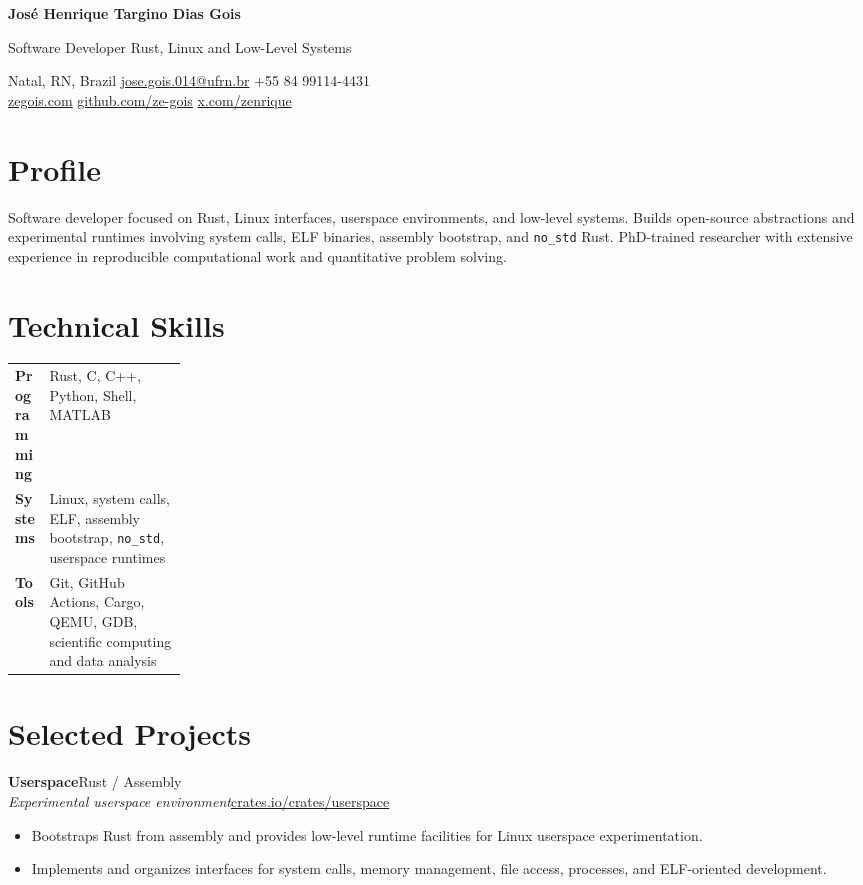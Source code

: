 \documentclass[10pt,a4paper]{article}
\newcommand{\entry}[4]{%
  \textbf{#1}\hfill\textcolor{muted}{#2}\\[-1pt]
  \textit{#3}\hfill\textcolor{muted}{#4}\par\vspace{2pt}
}
\begin{document}
{\fontsize{21}{24}\selectfont\bfseries\color{accent} José Henrique Targino Dias Gois}\par
\vspace{1pt}
{\large Software Developer \textbar{} Rust, Linux and Low-Level Systems}\par
\vspace{4pt}
\small
Natal, RN, Brazil \textbullet{}
\href{mailto:jose.gois.014@ufrn.br}{jose.gois.014@ufrn.br} \textbullet{}
+55 84 99114-4431\\
\href{https://zegois.com}{zegois.com} \textbullet{}
\href{https://github.com/ze-gois}{github.com/ze-gois} \textbullet{}
\href{https://x.com/zenrique}{x.com/zenrique}
\normalsize

\section{Profile}
Software developer focused on Rust, Linux interfaces, userspace environments, and low-level systems. Builds open-source abstractions and experimental runtimes involving system calls, ELF binaries, assembly bootstrap, and \texttt{no\_std} Rust. PhD-trained researcher with extensive experience in reproducible computational work and quantitative problem solving.

\section{Technical Skills}
\begin{tabularx}{\linewidth}{@{}>{\bfseries}p{0.20\linewidth}X@{}}
Programming & Rust, C, C++, Python, Shell, MATLAB \\
Systems & Linux, system calls, ELF, assembly bootstrap, \texttt{no\_std}, userspace runtimes \\
Tools & Git, GitHub Actions, Cargo, QEMU, GDB, scientific computing and data analysis
\end{tabularx}

\section{Selected Projects}
\entry{Userspace}{Rust / Assembly}{Experimental userspace environment}{\href{https://crates.io/crates/userspace}{crates.io/crates/userspace}}%
\begin{itemize}
  \item Bootstraps Rust from assembly and provides low-level runtime facilities for Linux userspace experimentation.
  \item Implements and organizes interfaces for system calls, memory management, file access, processes, and ELF-oriented development.
\end{itemize}
\end{document}
